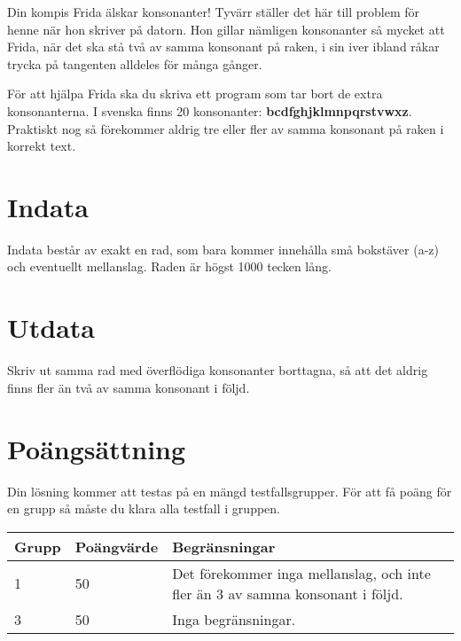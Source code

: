 Din kompis Frida älskar konsonanter! Tyvärr ställer det här till problem för henne när hon skriver på datorn. Hon gillar nämligen konsonanter så mycket att Frida, när det ska stå två av samma konsonant på raken, i sin iver ibland råkar trycka på tangenten alldeles för många gånger.

För att hjälpa Frida ska du skriva ett program som tar bort de extra konsonanterna. I svenska finns 20 konsonanter: \textbf{bcdfghjklmnpqrstvwxz}. Praktiskt nog så förekommer aldrig tre eller fler av samma konsonant på raken i korrekt text.

\section*{Indata}
Indata består av exakt en rad, som bara kommer innehålla små bokstäver (a-z) och eventuellt mellanslag. Raden är högst 1000 tecken lång.

\section*{Utdata}
Skriv ut samma rad med överflödiga konsonanter borttagna, så att det aldrig finns fler än två av samma konsonant i följd.

\section*{Poängsättning}
Din lösning kommer att testas på en mängd testfallsgrupper.
För att få poäng för en grupp så måste du klara alla testfall i gruppen.

\noindent
\begin{tabular}{| l | l | l |}
\hline
Grupp & Poängvärde & Begränsningar \\ \hline
1     & 50          &  Det förekommer inga mellanslag, och inte fler än 3 av samma konsonant i följd.\\ \hline
3     & 50         &  Inga begränsningar. \\ \hline
\end{tabular}


